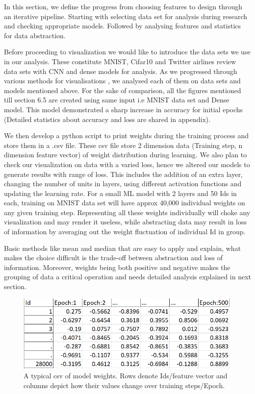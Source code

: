 \documentclass[journal]{vgtc}                %
\begin{document}
In this section, we define the progress from choosing features to design through an iterative pipeline.
Starting with selecting data set for analysis during research and
checking appropriate models. Followed by analysing features and statistics for data abstraction.

Before proceeding to visualization we would like to introduce the data sets we use in our analysis.
These constitute MNIST\cite{mnist}, Cifar10\cite{cifar10} and Twitter airlines review data sets\cite{airlines} with CNN and dense models for analysis.
As we progressed through various methods for visualisations , we analysed each of them on data sets and models mentioned above.
For the sake of comparison,  all the figures mentioned till section 6.5 are created using same input i.e MNIST data set and Dense model.
This model demonstrated a sharp increase in accuracy for initial epochs (Detailed statistics about accuracy and loss are shared in appendix).

We then develop a python script to print weights during the training process and store them in a .csv file.
These csv file store 2 dimension data (Training step, n dimension feature vector) of weight distribution during learning.
We also plan to check our visualization on data with a varied loss, hence we altered our models to generate results with range of loss.
This includes the addition of an extra layer, changing the number of units in layers, 
using different activation functions and updating the learning rate. 
For a small ML model with 2 layers and 50 Ids in each,  training on MNIST data set will have approx 40,000 individual weights on any given training step. Representing all these weights individually will
choke any visualization and may render it useless, while abstracting data may result in loss of information by averaging out the weight fluctuation of individual Id in group.

Basic methods like mean and median that are easy to apply and explain,
what makes the choice difficult is the trade-off between abstraction and loss of information.
Moreover, weights being both positive and negative makes the grouping of data a critical operation and needs detailed analysis explained in next section.
\begin{figure}
    \includegraphics[scale =0.7] {sample_data.png}
    \caption{A typical csv of model weights. Rows denote Ids/feature vector and columns depict how their values change over training steps/Epoch.}
    \label{fig:csv}
\end{figure}
\end{document}
